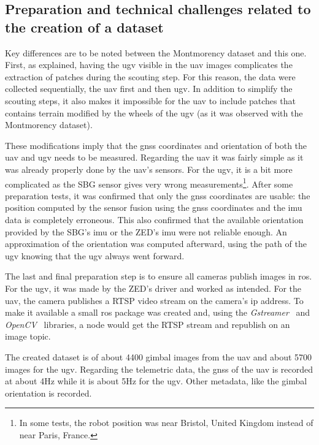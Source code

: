 \subsection{Preparation and technical challenges related to the creation of a dataset}

Key differences are to be noted between the Montmorency dataset and this one.
First, as explained, having the \gls{ugv} visible in the \gls{uav} images complicates the extraction of patches during the scouting step.
For this reason, the data were collected sequentially, the \gls{uav} first and then \gls{ugv}.
In addition to simplify the scouting steps, it also makes it impossible for the \gls{uav} to include patches that
contains terrain modified by the wheels of the \gls{ugv} (as it was observed with the Montmorency dataset).

These modifications imply that the \gls{gnss} coordinates and orientation of both the \gls{uav} and \gls{ugv} needs to be measured.
Regarding the \gls{uav} it was fairly simple as it was already properly done by the \gls{uav}'s sensors.
For the \gls{ugv}, it is a bit more complicated as the SBG sensor gives very wrong measurements\footnote{In some tests, the robot position was near Bristol, United Kingdom instead of near Paris, France.}.
After some preparation tests, it was confirmed that only the \gls{gnss} coordinates are usable: the position computed by the sensor fusion
using the \gls{gnss} coordinates and the \gls{imu} data is completely erroneous.
This also confirmed that the available orientation provided by the SBG's \gls{imu} or the ZED's \gls{imu} were not reliable enough.
An approximation of the orientation was computed afterward, using the path of the \gls{ugv} knowing that the \gls{ugv} always went forward.

The last and final preparation step is to ensure all cameras publish images in \gls{ros}.
For the \gls{ugv}, it was made by the ZED's driver and worked as intended.
For the \gls{uav}, the camera publishes a RTSP video stream on the camera's ip address.
To make it available a small \gls{ros} package was created and, using the \textit{Gstreamer}~\cite{noauthor_gstreamergstreamer_2025} and
\textit{OpenCV}~\cite{bradski_opencv_nodate} libraries, a node would get the RTSP stream and republish on an image topic.

The created dataset is of about 4400 gimbal images from the \gls{uav} and about 5700 images for the \gls{ugv}.
Regarding the telemetric data, the \gls{gnss} of the \gls{uav} is recorded at about 4Hz while it is about 5Hz for the \gls{ugv}.
Other metadata, like the gimbal orientation is recorded.

